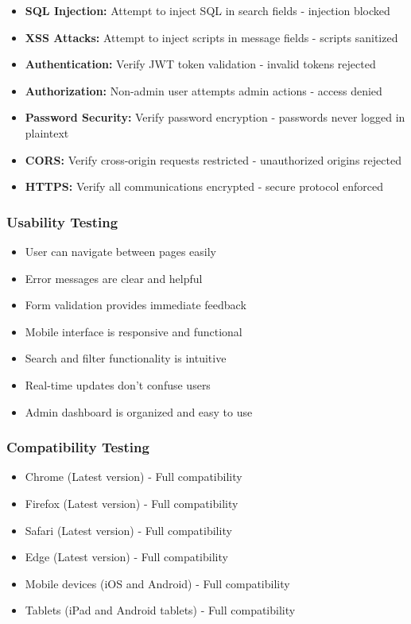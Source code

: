 \begin{itemize}
    \item \textbf{SQL Injection:} Attempt to inject SQL in search fields - injection blocked
    \item \textbf{XSS Attacks:} Attempt to inject scripts in message fields - scripts sanitized
    \item \textbf{Authentication:} Verify JWT token validation - invalid tokens rejected
    \item \textbf{Authorization:} Non-admin user attempts admin actions - access denied
    \item \textbf{Password Security:} Verify password encryption - passwords never logged in plaintext
    \item \textbf{CORS:} Verify cross-origin requests restricted - unauthorized origins rejected
    \item \textbf{HTTPS:} Verify all communications encrypted - secure protocol enforced
\end{itemize}

\subsubsection{Usability Testing}

\begin{itemize}
    \item User can navigate between pages easily
    \item Error messages are clear and helpful
    \item Form validation provides immediate feedback
    \item Mobile interface is responsive and functional
    \item Search and filter functionality is intuitive
    \item Real-time updates don't confuse users
    \item Admin dashboard is organized and easy to use
\end{itemize}

\subsubsection{Compatibility Testing}

\begin{itemize}
    \item Chrome (Latest version) - Full compatibility
    \item Firefox (Latest version) - Full compatibility
    \item Safari (Latest version) - Full compatibility
    \item Edge (Latest version) - Full compatibility
    \item Mobile devices (iOS and Android) - Full compatibility
    \item Tablets (iPad and Android tablets) - Full compatibility
\end{itemize}

